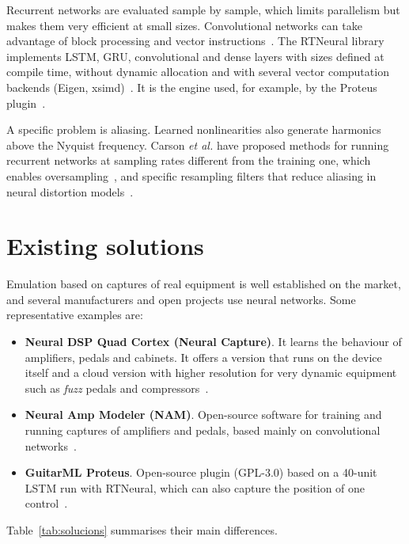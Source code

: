 \documentclass[ENG]{TFUOC}%
\begin{document}
Recurrent networks are evaluated sample by sample, which limits parallelism but makes them very efficient at small sizes. Convolutional networks can take advantage of block processing and vector instructions~\cite{wright2019,steinmetz2022}. The RTNeural library implements LSTM, GRU, convolutional and dense layers with sizes defined at compile time, without dynamic allocation and with several vector computation backends (Eigen, xsimd)~\cite{chowdhury2021}. It is the engine used, for example, by the Proteus plugin~\cite{proteus}.

A specific problem is aliasing. Learned nonlinearities also generate harmonics above the Nyquist frequency. Carson \emph{et al.} have proposed methods for running recurrent networks at sampling rates different from the training one, which enables oversampling~\cite{carson2024}, and specific resampling filters that reduce aliasing in neural distortion models~\cite{carson2025}.

\section{Existing solutions}
\label{s:mercat}

Emulation based on captures of real equipment is well established on the market, and several manufacturers and open projects use neural networks. Some representative examples are:
\begin{itemize}[nosep]
    \item \textbf{Neural DSP Quad Cortex (Neural Capture)}. It learns the behaviour of amplifiers, pedals and cabinets. It offers a version that runs on the device itself and a cloud version with higher resolution for very dynamic equipment such as \emph{fuzz} pedals and compressors~\cite{quadcortex}.
    \item \textbf{Neural Amp Modeler (NAM)}. Open-source software for training and running captures of amplifiers and pedals, based mainly on convolutional networks~\cite{nam}.
    \item \textbf{GuitarML Proteus}. Open-source plugin (GPL-3.0) based on a 40-unit LSTM run with RTNeural, which can also capture the position of one control~\cite{proteus}.
\end{itemize}
Table~\ref{tab:solucions} summarises their main differences.
\end{document}
